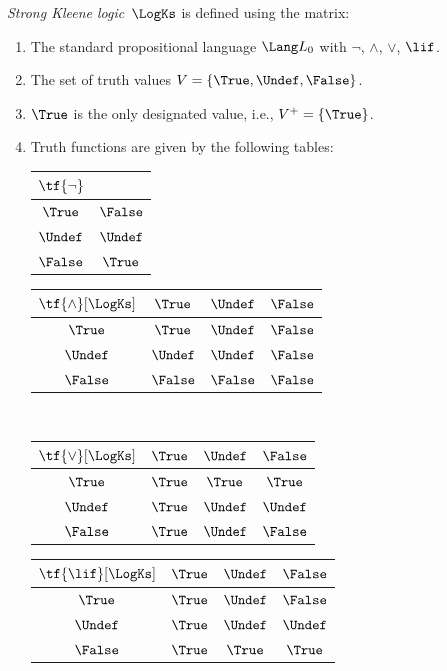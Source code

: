 \documentclass[../../../../include/open-logic-chapter]{subfiles}
\begin{document}
\begin{defn}
\emph{Strong Kleene logic}~$\LogKs$ is defined using the matrix:
\begin{enumerate}
  \item The standard propositional language $\Lang L_0$ with
  $\lnot$, $\land$, $\lor$, $\lif$.
  \item The set of truth values $V = \{\True, \Undef, \False\}$.
  \item $\True$ is the only designated value, i.e., $V^+ = \{\True\}$.
  \item Truth functions are given by the following tables:
  \begin{center}
    \begin{tabular}{c|c} 
      $\tf{\lnot}$ & \\ 
      \hline  
      $\True$ & $\False$ \\ 
      $\Undef$ & $\Undef$ \\
      $\False$ & $\True$ 
    \end{tabular}
    \quad
    \begin{tabular}{c|ccc} 
      $\tf{\land}[\LogKs]$ & $\True$ & $\Undef$ & $\False$ \\ 
      \hline 
      $\True$ & $\True$ & $\Undef$ & $\False$ \\ 
      $\Undef$ & $\Undef$ & $\Undef$ & $\False$\\ 
      $\False$ & $\False$ & $\False$ & $\False$ 
    \end{tabular}
    \\[2ex]
    \begin{tabular}{c|ccc} 
      $\tf{\lor}[\LogKs]$ & $\True$ & $\Undef$ & $\False$ \\ 
      \hline 
      $\True$ & $\True$ & $\True$ & $\True$ \\ 
      $\Undef$ & $\True$ & $\Undef$ & $\Undef$ \\
      $\False$ & $\True$ & $\Undef$ & $\False$ 
    \end{tabular}
    \quad
    \begin{tabular}{c|ccc} 
      $\tf{\lif}[\LogKs]$ & $\True$ & $\Undef$ & $\False$ \\ 
      \hline 
      $\True$ & $\True$ & $\Undef$ & $\False$ \\ 
      $\Undef$ & $\True$ & $\Undef$ & $\Undef$  \\ 
      $\False$ & $\True$ & $\True$ & $\True$ 
    \end{tabular}
  \end{center} 
\end{enumerate}
\end{defn}
\end{document}
